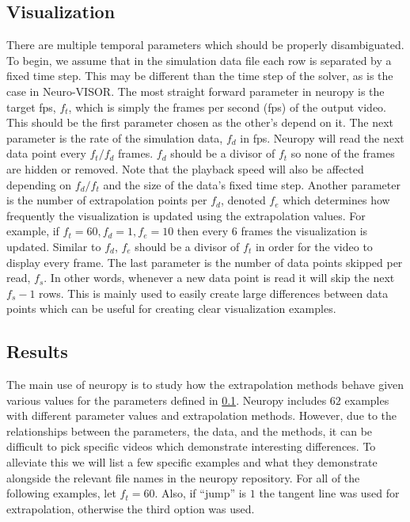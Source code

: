 \subsection{Visualization}%
\label{sub:visualization}
There are multiple temporal parameters which should be properly disambiguated.
To begin, we assume that in the simulation data file each row is separated by a fixed time step.
This may be different than the time step of the solver, as is the case in Neuro-VISOR.
The most straight forward parameter in neuropy is the target fps, $f_t$, which is simply the frames per second (fps) of the output video.
This should be the first parameter chosen as the other's depend on it.
The next parameter is the rate of the simulation data, $f_d$ in fps.
Neuropy will read the next data point every $f_t / f_d$ frames.
$f_d$ should be a divisor of $f_t$ so none of the frames are hidden or removed.
Note that the playback speed will also be affected depending on $f_d / f_t$ and the size of the data's fixed time step.
Another parameter is the number of extrapolation points per $f_d$, denoted $f_e$ which determines how frequently the visualization is updated using the extrapolation values.
For example, if $f_t=60,f_d=1,f_e=10$ then every $6$ frames the visualization is updated.
Similar to $f_d$, $f_e$ should be a divisor of $f_t$ in order for the video to display every frame.
The last parameter is the number of data points skipped per read, $f_s$.
In other words, whenever a new data point is read it will skip the next $f_s - 1$ rows.
This is mainly used to easily create large differences between data points which can be useful for creating clear visualization examples.

\subsection{Results}%
\label{sub:results}
The main use of neuropy is to study how the extrapolation methods behave given various values for the parameters defined in \cref{sub:visualization}.
Neuropy includes $62$ examples with different parameter values and extrapolation methods.
However, due to the relationships between the parameters, the data, and the methods, it can be difficult to pick specific videos which demonstrate interesting differences.
To alleviate this we will list a few specific examples and what they demonstrate alongside the relevant file names in the neuropy repository\cite{neuropy}.
For all of the following examples, let $f_t=60$.
Also, if ``jump'' is $1$ the tangent line was used for extrapolation, otherwise the third option was used.

